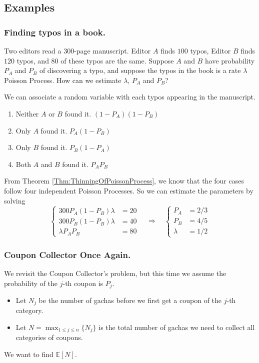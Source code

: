     \subsection{Examples}
        \subsubsection{Finding typos in a book.} Two editors read a 300-page manuscript. Editor $A$ finds $100$ typos, Editor $B$ finds $120$ typos, and $80$ of these typos are the same. Suppose $A$ and $B$ have probability $P_A$ and $P_B$ of discovering a typo, and suppose the typos in the book is a rate $\lambda$ Poisson Process. How can we estimate $\lambda$, $P_A$ and $P_B$?
    
        We can associate a random variable with each typos appearing in the manuscript.
        \begin{enumerate}
            \item Neither $A$ or $B$ found it. $(1-P_A)(1-P_B)$
            \item Only $A$ found it. $P_A(1-P_B)$
            \item Only $B$ found it. $P_B(1-P_A)$
            \item Both $A$ and $B$ found it. $P_AP_B$
        \end{enumerate}
        From Theorem \ref{Thm:ThinningOfPoissonProcess}, we know that the four cases follow four independent Poisson Processes. So we can estimate the parameters by solving
        \[
        \begin{cases}
            300P_A(1-P_B)\lambda &= 20\\
            300P_B(1-P_B)\lambda &= 40\\
            \lambda P_AP_B &= 80
        \end{cases}
        \quad \Longrightarrow \quad
        \begin{cases}
            P_A &= 2/3\\
            P_B &= 4/5\\
            \lambda &= 1/2
        \end{cases}
        \]
    
    \subsubsection{Coupon Collector Once Again.}
    We revisit the Coupon Collector's problem, but this time we assume the probability of the $j$-th coupon is $P_j$.
    \begin{itemize}
        \item Let $N_j$ be the number of gachas before we first get a coupon of the $j$-th category.
        \item Let $N = \max_{1 \le j \le n}\{N_j\}$ is the total number of gachas we need to collect all categories of coupons.
    \end{itemize}
    We want to find $\mathbb{E}[N]$.


